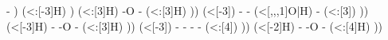 \begin{struct}
{                                                                                    -
                                                                                )
                                                                                    (<:[-3]H)
                                                                                )
                                                                                (<:[3]H)
                                                                            -O
                                                                            -
                                                                                (<:[3]H)
                                                                        ))
                                                                            (<[-3])
                                                                        -
                                                                        -
                                                                            (<[,,,1]O|H)
                                                                        -
                                                                            (<:[3])
                                                                    ))
                                                                        (<[-3]H)
                                                                    -
                                                                    -O
                                                                    -
                                                                        (<:[3]H)
                                                                ))
                                                                    (<[-3])
                                                                -
                                                                -
                                                                -
                                                                -
                                                                    (<:[4])
                                                            ))
                                                                (<[-2]H)
                                                            -
                                                            -O
                                                            -
                                                                (<:[4]H)
                                                        ))
}
\end{struct}
